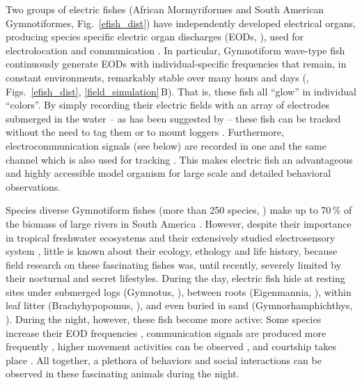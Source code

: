 \documentclass[11pt,pdftex]{article}
\newcommand{\panel}[1]{\textsf{#1}}
\newcommand{\fref}[1]{\textup{\ref{#1}}}
\newcommand{\subfref}[2]{\textup{\ref{#1}}\,\panel{#2}}
\newcommand{\figb}{Fig.}
\newcommand{\figsb}{Figs.}
\newcommand{\figrefb}[1]{\figb~\fref{#1}}
\newcommand{\figsrefb}[1]{\figsb~\fref{#1}}
\begin{document}
Two groups of electric fishes (African Mormyriformes and South American Gymnotiformes, \figrefb{efish_dist}) have independently developed electrical organs, producing species specific electric organ discharges (EODs, \citealp{Hopkins1978, Turner2007}), used for electrolocation \citep{Nelson1999, Fotowat2013} and communication \citep{Smith2013}. In particular, Gymnotiform wave-type fish continuously generate EODs with individual-specific frequencies that remain, in constant environments, remarkably stable over many hours and days (\citealp{Bullock1970, Moortgat1998}, \figsrefb{efish_dist}, \subfref{field_simulation}{B}). That is, these fish all “glow” in individual “colors”. By simply recording their electric fields with an array of electrodes submerged in the water -- as has been suggested by \citet{Hagedorn1985} -- these fish can be tracked without the need to tag them or to mount loggers \citep{Jun2013, Matias2015, Madhav2018, Henninger2018, Henninger2020}. Furthermore, electrocommunication signals (see below) are recorded in one and the same channel which is also used for tracking \citep{Henninger2018}. This makes electric fish an advantageous and highly accessible model organism for large scale and detailed behavioral observations.

Species diverse Gymnotiform fishes (more than 250 species, \citealp{Albert2005, Ferraris2017}) make up to 70\,\% of the biomass of large rivers in South America \citep{Marrero1991, Cox2004, Crampton2011}. However, despite their importance in tropical freshwater ecosystems \citep{Cox2004, Crampton2011} and their extensively studied electrosensory system \citep{Benda2005, Bullock2006, Grewe2017, Sinz2020}, little is known about their ecology, ethology and life history, because field research on these fascinating fishes was, until recently, severely limited by their nocturnal and secret lifestyles. During the day, electric fish hide at resting sites under submerged logs (Gymnotus, \citealp{Westby1970}), between roots (Eigenmannia, \citealp{Hopkins1974}), within leaf litter (Brachyhypopomus, \citealp{Hagedorn1988}), and even buried in sand (Gymnorhamphichthys, \citealp{Lissmann1965}). During the night, however, these fish become more active: Some species increase their EOD frequencies \citep{Lissmann1965, Stoddard2007}, communication signals are produced more frequently \citep{Zupanc2001, Henninger2018}, higher movement activities can be observed \citep{Henninger2020}, and courtship takes place \citep{Hagedorn1985, Henninger2018}. All together, a plethora of behaviors and social interactions can be observed in these fascinating animals during the night.
\end{document}
